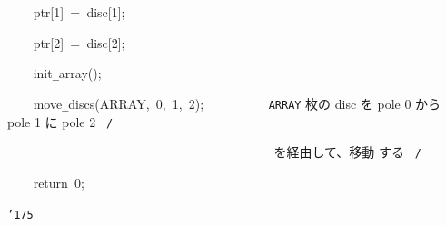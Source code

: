 \documentclass{article}
\begin{document}
\noindent
\mbox{}{\tt\mc \ \ \ \ }ptr[1]{\tt\mc \ }={\tt\mc \ }disc[1];

\noindent
\mbox{}{\tt\mc \ \ \ \ }ptr[2]{\tt\mc \ }={\tt\mc \ }disc[2];

\noindent
\mbox{}\hfill

\noindent
\mbox{}{\tt\mc \ \ \ \ }init{\tt\_}array();

\noindent
\mbox{}{\tt\mc \ \ \ \ }move{\tt\_}discs(ARRAY,{\tt\mc \ }0,{\tt\mc \ }1,{\tt\mc \ }2);{\tt\mc \ }{\tt\mc \ \ \ \ \ \ \ \ }\rm\mc {\tt /}{\tt *}\  {}{\tt ARRAY} 枚の disc を
					   pole 0 から pole 1 に pole 2
					   \hfill \rm\mc \ {\tt *}{\tt /}
\tt\mc 

\noindent
\mbox{}{\tt\mc \ \ \ \ \ \ \ \ }{\tt\mc \ \ \ \ \ \ \ \ }{\tt\mc \ \ \ \ \ \ \ \ }{\tt\mc \ \ \ \ \ \ \ \ }{\tt\mc \ \ \ \ \ \ \ \ }\rm\mc {\tt /}{\tt *}\  {}を経由して、移動
					   する \hfill \rm\mc \ {\tt *}{\tt /}
\tt\mc 

\noindent
\mbox{}{\tt\mc \ \ \ \ }return{\tt\mc \ }0;

\noindent
\mbox{}{\tt\char'175}

\noindent
\mbox{}

\rm\mc
\end{document}
